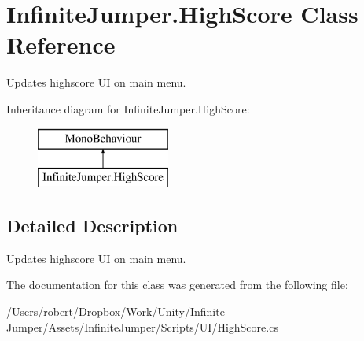 \hypertarget{class_infinite_jumper_1_1_high_score}{}\section{Infinite\+Jumper.\+High\+Score Class Reference}
\label{class_infinite_jumper_1_1_high_score}


Updates highscore U\+I on main menu.  


Inheritance diagram for Infinite\+Jumper.\+High\+Score\+:\begin{figure}[H]
\begin{center}
\leavevmode
\includegraphics[height=2.000000cm]{class_infinite_jumper_1_1_high_score}
\end{center}
\end{figure}


\subsection{Detailed Description}
Updates highscore U\+I on main menu. 



The documentation for this class was generated from the following file\+:\begin{DoxyCompactItemize}
\item 
/\+Users/robert/\+Dropbox/\+Work/\+Unity/\+Infinite Jumper/\+Assets/\+Infinite\+Jumper/\+Scripts/\+U\+I/High\+Score.\+cs\end{DoxyCompactItemize}

